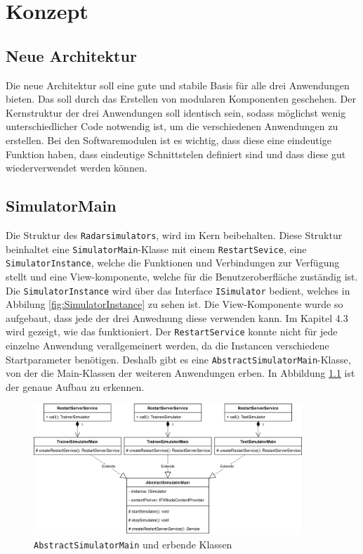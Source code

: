 \chapter{Konzept}

\section{Neue Architektur}
Die neue Architektur soll eine gute und stabile Basis für alle drei Anwendungen bieten. Das soll durch das Erstellen von modularen Komponenten geschehen. Der Kernstruktur der drei Anwendungen soll identisch sein, sodass möglichst wenig unterschiedlicher Code notwendig ist, um die verschiedenen Anwendungen zu erstellen. Bei den Softwaremodulen ist es wichtig, dass diese eine eindeutige Funktion haben, dass eindeutige Schnittstelen definiert sind und dass diese gut wiederverwendet werden können. 

\section{SimulatorMain}
Die Struktur des \texttt{Radarsimulators}, wird im Kern beibehalten. Diese Struktur beinhaltet eine \texttt{SimulatorMain}-Klasse mit einem \texttt{RestartSevice}, eine \texttt{SimulatorInstance}, welche die Funktionen und Verbindungen zur Verfügung stellt und eine View-komponente, welche für die Benutzeroberfläche zuständig ist.  Die \texttt{SimulatorInstance} wird über das Interface \texttt{ISimulator} bedient, welches in Abbilung \ref{fig:SimulatorInstance} zu sehen ist. Die View-Komponente wurde so aufgebaut, dass jede der drei Anwednung diese verwenden kann. Im Kapitel 4.3 wird gezeigt, wie das funktioniert. Der \texttt{RestartService} konnte nicht für jede einzelne Anwendung verallgemeinert werden, da die Instancen verschiedene Startparameter benötigen. Deshalb gibt es eine \texttt{AbstractSimulatorMain}-Klasse, von der die Main-Klassen der weiteren Anwendungen erben. In Abbildung \ref{fig:abstractMain} ist der genaue Aufbau zu erkennen. 

\begin{figure}[ht]
    \centering
    \includegraphics[width=0.9\textwidth]{content/assets/Kapitel4/AbstractMain.png}
    \caption{\texttt{AbstractSimulatorMain} und erbende Klassen}
    \label{fig:abstractMain}
\end{figure}

